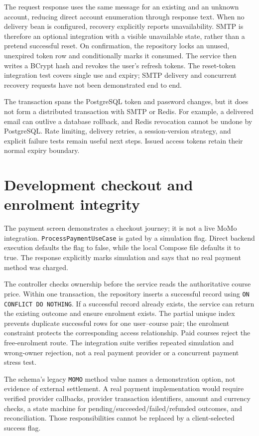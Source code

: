 \documentclass[12pt,a4paper,oneside]{report}
\begin{document}
The request response uses the same message for an existing and an unknown account,
reducing direct account enumeration through response text. When no delivery bean is
configured, recovery explicitly reports unavailability. SMTP is therefore an optional
integration with a visible unavailable state, rather than a pretend successful reset.
On confirmation, the repository locks an unused, unexpired token row and conditionally
marks it consumed. The service then writes a BCrypt hash and revokes the user's refresh
tokens. The reset-token integration test covers single use and expiry; SMTP delivery
and concurrent recovery requests have not been demonstrated end to end.

The transaction spans the PostgreSQL token and password changes, but it does not form
a distributed transaction with SMTP or Redis. For example, a delivered email can outlive
a database rollback, and Redis revocation cannot be undone by PostgreSQL. Rate limiting,
delivery retries, a session-version strategy, and explicit failure tests remain useful
next steps. Issued access tokens retain their normal expiry boundary.

\section{Development checkout and enrolment integrity}
The payment screen demonstrates a checkout journey; it is not a live MoMo integration.
\texttt{ProcessPaymentUseCase} is gated by a simulation flag. Direct backend execution
defaults the flag to false, while the local Compose file defaults it to true. The response
explicitly marks simulation and says that no real payment method was charged.

\paymentsimulationdiagram

The controller checks ownership before the service reads the authoritative course price.
Within one transaction, the repository inserts a successful record using
\texttt{ON CONFLICT DO NOTHING}. If a successful record already exists, the service
can return the existing outcome and ensure enrolment exists. The partial unique index
prevents duplicate successful rows for one user--course pair; the enrolment constraint
protects the corresponding access relationship. Paid courses reject the free-enrolment
route. The integration suite verifies repeated simulation and wrong-owner rejection,
not a real payment provider or a concurrent payment stress test.

The schema's legacy \texttt{MOMO} method value names a demonstration option, not evidence
of external settlement. A real payment implementation would require verified provider
callbacks, provider transaction identifiers, amount and currency checks, a state machine
for pending/succeeded/failed/refunded outcomes, and reconciliation. Those responsibilities
cannot be replaced by a client-selected success flag.
\end{document}
